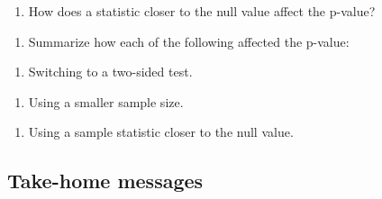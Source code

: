 \documentclass[
]{report}
\providecommand{\tightlist}{%
  \setlength{\itemsep}{0pt}\setlength{\parskip}{0pt}}
\begin{document}
\begin{enumerate}
\def\labelenumi{\arabic{enumi}.}
\setcounter{enumi}{18}
\tightlist
\item
  How does a statistic closer to the null value affect the p-value?
\end{enumerate}

\vspace{0.3in}

\begin{enumerate}
\def\labelenumi{\arabic{enumi}.}
\setcounter{enumi}{19}
\tightlist
\item
  Summarize how each of the following affected the p-value:
\end{enumerate}

\begin{enumerate}
\def\labelenumi{\alph{enumi})}
\tightlist
\item
  Switching to a two-sided test.
\end{enumerate}

\vspace{0.4in}

\begin{enumerate}
\def\labelenumi{\alph{enumi})}
\setcounter{enumi}{1}
\tightlist
\item
  Using a smaller sample size.
\end{enumerate}

\vspace{0.4in}

\begin{enumerate}
\def\labelenumi{\alph{enumi})}
\setcounter{enumi}{2}
\tightlist
\item
  Using a sample statistic closer to the null value.
\end{enumerate}

\vspace{0.4in}

\hypertarget{take-home-messages-11}{%
\subsection{Take-home messages}\label{take-home-messages-11}}
\end{document}
